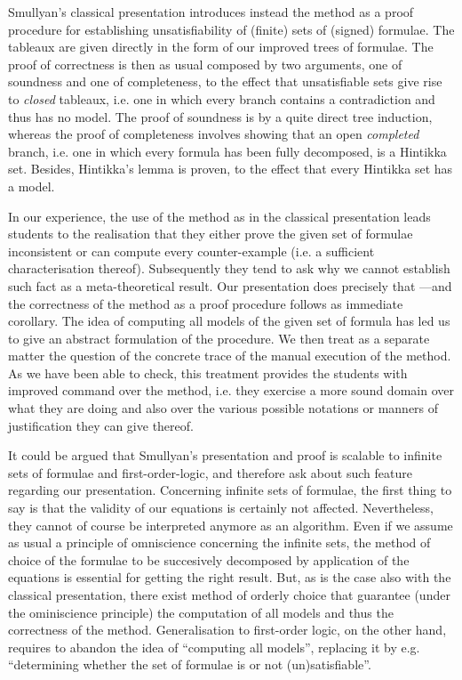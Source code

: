 \documentclass[a4paper,UKenglish]{lipics}
\newcounter{c}
\begin{document}
Smullyan's  classical presentation \cite{Smullyan} introduces instead the method as a proof procedure for establishing unsatisfiability of (finite) sets of (signed) formulae. The tableaux are given directly in the form of our improved trees of formulae. The proof of correctness is then as usual composed by two arguments, one of soundness and one of completeness, to the effect that unsatisfiable sets give rise to \textit{closed} tableaux, i.e. one in which every branch contains a contradiction and thus has no model. The proof of soundness is by a quite direct tree induction, whereas the proof of completeness involves showing that an open \textit{completed} branch, i.e. one in which every formula has been fully decomposed, is  a Hintikka set. Besides, Hintikka's lemma is proven, to the effect that every Hintikka set has a model.

In our experience, the use of the method as in the classical presentation leads students to the realisation that they either prove the given set of formulae inconsistent or can compute every counter-example (i.e. a sufficient characterisation thereof). Subsequently they tend to ask why we cannot establish such fact as a meta-theoretical result. Our presentation does precisely that ---and the correctness of the method as a proof procedure follows as immediate corollary. 
The idea of computing all models of the given set of formula has led us to give an abstract formulation of the procedure. 
We then treat as a separate matter the question of the concrete trace of the manual execution of the method. As we have been able to check, this treatment provides the students with improved command over the method, i.e. they exercise a more sound domain over what they are doing and also over the various possible notations or manners of justification they can give thereof.

It could be argued that Smullyan's presentation and proof is scalable to infinite sets of formulae and first-order-logic, and therefore ask about such feature regarding our presentation. Concerning infinite sets of formulae, the first thing to say is that  the validity of our equations is certainly not affected. Nevertheless, they cannot of course be interpreted anymore as an algorithm. Even if we assume as usual a principle of omniscience concerning the infinite sets, the method of choice of the formulae to be succesively decomposed by application of the equations is essential for getting the right result. But, as is the case also with the classical presentation, there exist method of orderly choice that guarantee (under the ominiscience principle) the computation of all models and thus the correctness of the method.
Generalisation to first-order logic, on the other hand, requires to abandon the idea of ``computing all models'', replacing it by e.g. ``determining whether the set of formulae is or not (un)satisfiable''.
\end{document}
